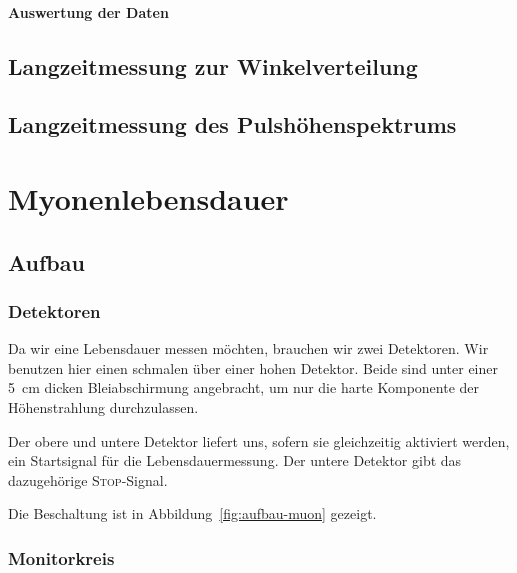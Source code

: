\documentclass[11pt, ngerman, fleqn, DIV=15, headinclude, BCOR=2cm]{scrreprt}
\begin{document}

\subsubsection{Auswertung der Daten}


\section{Langzeitmessung zur Winkelverteilung}
\label{sec:langzeit_winkel}

\section{Langzeitmessung des Pulshöhenspektrums}
\label{sec:langzeit_puls}

\chapter{Myonenlebensdauer}

\section{Aufbau}

\subsection{Detektoren}

Da wir eine Lebensdauer messen möchten, brauchen wir zwei Detektoren. Wir
benutzen hier einen schmalen über einer hohen Detektor. Beide sind unter einer
\SI{5}{\centi\meter} dicken Bleiabschirmung angebracht, um nur die harte
Komponente der Höhenstrahlung durchzulassen.

Der obere und untere Detektor liefert uns, sofern sie gleichzeitig aktiviert
werden, ein Startsignal für die Lebensdauermessung. Der untere Detektor gibt
das dazugehörige \textsc{Stop}-Signal.

Die Beschaltung ist in Abbildung~\ref{fig:aufbau-muon} gezeigt.


\subsection{Monitorkreis}
\end{document}
